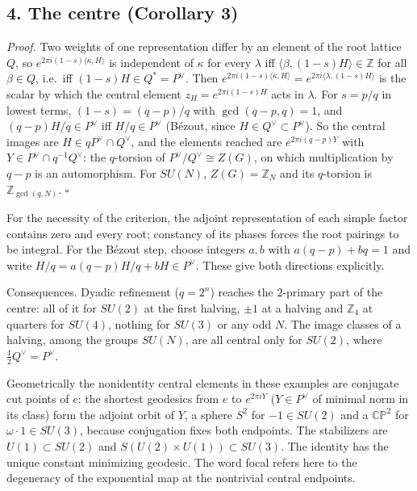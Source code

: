 \documentclass[11pt,a4paper]{article}
\begin{document}
\hypertarget{the-centre-corollary-3}{%
\subsection{4. The centre (Corollary 3)}\label{the-centre-corollary-3}}

\emph{Proof.} Two weights of one representation differ by an element of
the root lattice \(Q\), so \(e^{2\pi i(1-s)\langle\kappa,H\rangle}\) is
independent of \(\kappa\) for every \(\lambda\) iff
\(\langle\beta,(1-s)H\rangle\in\mathbb Z\) for all \(\beta\in Q\),
i.e.~iff \((1-s)H\in Q^*=P^\vee\). Then
\(e^{2\pi i(1-s)\langle\kappa,H\rangle}=e^{2\pi i\langle\lambda,(1-s)H\rangle}\)
is the scalar by which the central element \(z_H=e^{2\pi i(1-s)H}\) acts
in \(\lambda\). For \(s=p/q\) in lowest terms, \((1-s)=(q-p)/q\) with
\(\gcd(q-p,q)=1\), and \((q-p)H/q\in P^\vee\) iff \(H/q\in P^\vee\)
(Bézout, since \(H\in Q^\vee\subset P^\vee\)). So the central images are
\(H\in qP^\vee\cap Q^\vee\), and the elements reached are
\(e^{2\pi i(q-p)Y}\) with \(Y\in P^\vee\cap q^{-1}Q^\vee\): the
\(q\)-torsion of \(P^\vee/Q^\vee\cong Z(G)\), on which multiplication by
\(q-p\) is an automorphism. For \(SU(N)\), \(Z(G)=\mathbb Z_N\) and its
\(q\)-torsion is \(\mathbb Z_{\gcd(q,N)}\). \(\square\)

For the necessity of the criterion, the adjoint representation of each
simple factor contains zero and every root; constancy of its phases
forces the root pairings to be integral. For the Bézout step, choose
integers \(a,b\) with \(a(q-p)+bq=1\) and write
\(H/q=a(q-p)H/q+bH\in P^\vee\). These give both directions explicitly.

Consequences. Dyadic refinement (\(q=2^n\)) reaches the \(2\)-primary
part of the centre: all of it for \(SU(2)\) at the first halving,
\(\pm1\) at a halving and \(\mathbb Z_4\) at quarters for \(SU(4)\),
nothing for \(SU(3)\) or any odd \(N\). The image classes of a halving,
among the groups \(SU(N)\), are all central only for \(SU(2)\), where
\(\frac12Q^\vee=P^\vee\).

Geometrically the nonidentity central elements in these examples are
conjugate cut points of \(e\): the shortest geodesics from \(e\) to
\(e^{2\pi iY}\) (\(Y\in P^\vee\) of minimal norm in its class) form the
adjoint orbit of \(Y\), a sphere \(S^2\) for \(-1\in SU(2)\) and a
\(\mathbb{CP}^2\) for \(\omega\cdot1\in SU(3)\), because conjugation
fixes both endpoints. The stabilizers are \(U(1)\subset SU(2)\) and
\(S(U(2)\times U(1))\subset SU(3)\). The identity has the unique
constant minimizing geodesic. The word focal refers here to the
degeneracy of the exponential map at the nontrivial central endpoints.
\end{document}
